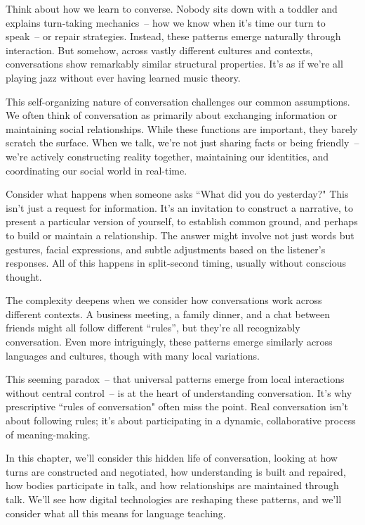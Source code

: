 Think about how we learn to converse. Nobody sits down with a toddler and explains turn-taking mechanics~-- how we know when it's time our turn to speak~-- or repair strategies. Instead, these patterns emerge naturally through interaction. But somehow, across vastly different cultures and contexts, conversations show remarkably similar structural properties. It's as if we're all playing jazz without ever having learned music theory.

This self-organizing nature of conversation challenges our common assumptions. We often think of conversation as primarily about exchanging information or maintaining social relationships. While these functions are important, they barely scratch the surface. When we talk, we're not just sharing facts or being friendly~-- we're actively constructing reality together, maintaining our identities, and coordinating our social world in real-time.

Consider what happens when someone asks ``What did you do yesterday?" This isn't just a request for information. It's an invitation to construct a narrative, to present a particular version of yourself, to establish common ground, and perhaps to build or maintain a relationship. The answer might involve not just words but gestures, facial expressions, and subtle adjustments based on the listener's responses. All of this happens in split-second timing, usually without conscious thought.

The complexity deepens when we consider how conversations work across different contexts. A business meeting, a family dinner, and a chat between friends might all follow different ``rules'', but they're all recognizably conversation. Even more intriguingly, these patterns emerge similarly across languages and cultures, though with many local variations.

This seeming paradox~-- that universal patterns emerge from local interactions without central control~-- is at the heart of understanding conversation. It's why prescriptive ``rules of conversation" often miss the point. Real conversation isn't about following rules; it's about participating in a dynamic, collaborative process of meaning-making.

In this chapter, we'll consider this hidden life of conversation, looking at how turns are constructed and negotiated, how understanding is built and repaired, how bodies participate in talk, and how relationships are maintained through talk. We'll see how digital technologies are reshaping these patterns, and we'll consider what all this means for language teaching.

